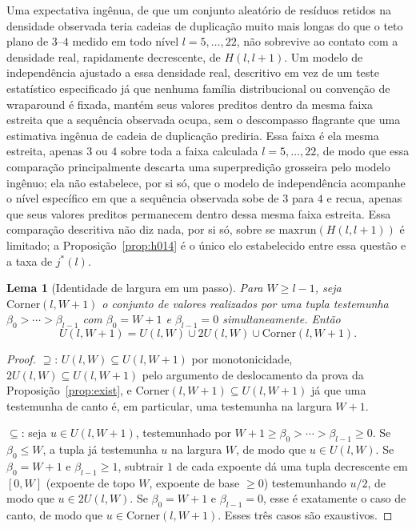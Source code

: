 \documentclass[11pt]{amsart}
\theoremstyle{plain}
\newtheorem{lemma}[theorem]{Lema}
\theoremstyle{definition}
\theoremstyle{remark}
\begin{document}
Uma expectativa ingênua, de que um conjunto aleatório de resíduos retidos na densidade observada
teria cadeias de duplicação muito mais longas do que o teto plano de $3$--$4$ medido em todo nível
$l=5,\dots,22$, não sobrevive ao contato com a densidade real, rapidamente decrescente, de
$H(l,l+1)$. Um modelo de independência ajustado a essa densidade real, descritivo em vez de um
teste estatístico especificado já que nenhuma família distribucional ou convenção de wraparound é
fixada, mantém seus valores preditos dentro da mesma faixa estreita que a sequência observada
ocupa, sem o descompasso flagrante que uma estimativa ingênua de cadeia de duplicação prediria.
Essa faixa é ela mesma estreita, apenas $3$ ou $4$ sobre toda a faixa calculada $l=5,\dots,22$, de
modo que essa comparação principalmente descarta uma superpredição grosseira pelo modelo ingênuo;
ela não estabelece, por si só, que o modelo de independência acompanhe o nível específico em que a
sequência observada sobe de $3$ para $4$ e recua, apenas que seus valores preditos permanecem
dentro dessa mesma faixa estreita. Essa comparação descritiva não diz nada, por si só, sobre se
$\mathrm{maxrun}(H(l,l+1))$ é limitado; a Proposição~\ref{prop:h014} é o único elo estabelecido
entre essa questão e a taxa de $j^*(l)$.

\begin{lemma}[Identidade de largura em um passo]
\label{lem:width}
Para $W\ge l-1$, seja $\mathrm{Corner}(l,W+1)$ o conjunto de valores realizados por uma tupla
testemunha $\beta_0>\cdots>\beta_{l-1}$ com $\beta_0=W+1$ e $\beta_{l-1}=0$ simultaneamente. Então
\[
U(l,W+1) = U(l,W) \cup 2U(l,W) \cup \mathrm{Corner}(l,W+1).
\]
\end{lemma}

\begin{proof}
$\supseteq$: $U(l,W)\subseteq U(l,W+1)$ por monotonicidade, $2U(l,W)\subseteq U(l,W+1)$ pelo
argumento de deslocamento da prova da Proposição~\ref{prop:exist}, e
$\mathrm{Corner}(l,W+1)\subseteq U(l,W+1)$ já que uma testemunha de canto é, em particular, uma
testemunha na largura $W+1$.

$\subseteq$: seja $u\in U(l,W+1)$, testemunhado por $W+1\ge\beta_0>\cdots>\beta_{l-1}\ge0$. Se
$\beta_0\le W$, a tupla já testemunha $u$ na largura $W$, de modo que $u\in U(l,W)$. Se $\beta_0=W+1$
e $\beta_{l-1}\ge1$, subtrair $1$ de cada expoente dá uma tupla decrescente em $[0,W]$ (expoente de
topo $W$, expoente de base $\ge0$) testemunhando $u/2$, de modo que $u\in2U(l,W)$. Se $\beta_0=W+1$
e $\beta_{l-1}=0$, esse é exatamente o caso de canto, de modo que $u\in\mathrm{Corner}(l,W+1)$.
Esses três casos são exaustivos.
\end{proof}
\end{document}
